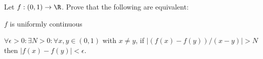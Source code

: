 Let $f:(0,1)\rightarrow \R$. Prove that the following are equivalent:
\begin{alist}
\item $f$ is uniformly continuous
\item $\forall \epsilon>0:\exists N>0:\forall x,y\in (0,1)$ with
$x\neq y$, if $|(f(x)-f(y))/(x-y)|>N$ then $|f(x)-f(y)|<\epsilon$.
\end{alist}
